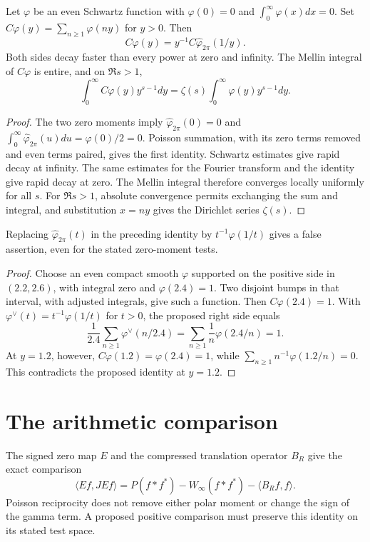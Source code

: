 \begin{proposition}
\label{v4-arith:w7-i:thm:burnol-copoisson}
Let $\varphi$ be an even Schwartz function with $\varphi(0)=0$ and
$\int_0^\infty\varphi(x)dx=0$.
Set $C\varphi(y)=\sum_{n\ge1}\varphi(ny)$ for $y>0$.
Then
\[
 C\varphi(y)=y^{-1}C\widehat\varphi_{2\pi}(1/y).
\]
Both sides decay faster than every power at zero and infinity.
The Mellin integral of $C\varphi$ is entire, and on $\Re s>1$,
\[
 \int_0^\infty C\varphi(y)y^{s-1}dy
 =\zeta(s)\int_0^\infty\varphi(y)y^{s-1}dy.
\]
\end{proposition}
\begin{proof}
The two zero moments imply
$\widehat\varphi_{2\pi}(0)=0$ and
$\int_0^\infty\widehat\varphi_{2\pi}(u)du=\varphi(0)/2=0$.
Poisson summation, with its zero terms removed and even terms paired,
gives the first identity. Schwartz estimates give rapid decay at
infinity. The same estimates for the Fourier transform and the
identity give rapid decay at zero. The Mellin integral therefore
converges locally uniformly for all $s$.
For $\Re s>1$, absolute convergence permits exchanging the sum and
integral, and substitution $x=ny$ gives the Dirichlet series $\zeta(s)$.
\end{proof}

\begin{proposition}
Replacing $\widehat\varphi_{2\pi}(t)$ in the preceding identity by
$t^{-1}\varphi(1/t)$ gives a false assertion, even for the stated
zero-moment tests.
\end{proposition}
\begin{proof}
Choose an even compact smooth $\varphi$ supported on the positive
side in $(2.2,2.6)$, with integral zero and $\varphi(2.4)=1$.
Two disjoint bumps in that interval, with adjusted integrals, give
such a function. Then $C\varphi(2.4)=1$.
With $\varphi^\vee(t)=t^{-1}\varphi(1/t)$ for $t>0$, the proposed
right side equals
\[
 \frac1{2.4}\sum_{n\ge1}\varphi^\vee(n/2.4)
 =\sum_{n\ge1}\frac1n\varphi(2.4/n)=1.
\]
At $y=1.2$, however, $C\varphi(1.2)=\varphi(2.4)=1$, while
$\sum_{n\ge1}n^{-1}\varphi(1.2/n)=0$.
This contradicts the proposed identity at $y=1.2$.
\end{proof}

\section{The arithmetic comparison}
The signed zero map $E$ and the compressed translation operator
$B_R$ give the exact comparison
\[
 \langle Ef,JEf\rangle
 =P(f*f^*)-W_\infty(f*f^*)-\langle B_Rf,f\rangle.
\]
Poisson reciprocity does not remove either polar moment or change
the sign of the gamma term. A proposed positive comparison must
preserve this identity on its stated test space.
